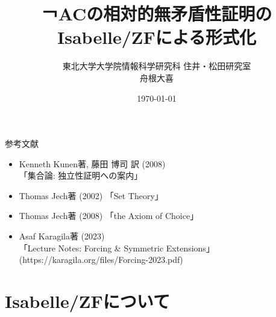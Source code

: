 \documentclass[17pt,aspectratio=169]{beamer}
\title{￢ACの相対的無矛盾性証明のIsabelle/ZFによる形式化}
\author{東北大学大学院情報科学研究科 住井・松田研究室 \\ 舟根大喜}
\date{\today}
\begin{document}
\maketitle

\begin{frame} {参考文献} 
      
    {\small
        \begin{itemize}[itemsep=5pt]
            \item Kenneth Kunen著, 藤田 博司 訳 (2008) \\「集合論: 独立性証明への案内」
            \item Thomas Jech著 (2002) 「Set Theory」
            \item Thomas Jech著 (2008) 「the Axiom of Choice」
            \item Asaf Karagila著 (2023) \\ 「Lecture Notes: Forcing \& Symmetric Extensions」 \\
                  {\small (https://karagila.org/files/Forcing-2023.pdf) }
        \end{itemize}}
\end{frame}

\section{Isabelle/ZFについて}
\end{document}
